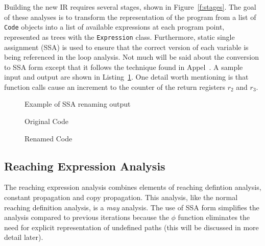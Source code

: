 
Building the new IR requires several stages, shown in Figure~\ref{f:stages}. The goal of these analyses is to transform the representation of the program from a list of \texttt{Code} objects into a list of available expressions at each program point, represented as trees with the \texttt{Expression} class. Furthermore, static single assignment (SSA) is used to ensure that the correct version of each variable is being referenced in the loop analysis. Not much will be said about the conversion to SSA form except that it follows the technique found in Appel~\cite{andrew2002modern}. A sample input and output are shown in Listing~\ref{l:ssa-example}. One detail worth mentioning is that function calls cause an increment to the counter of the return registers $r_2$ and $r_3$.


\begin{figure}[h]
\captionsetup{type=lstlisting}
\caption{Example of SSA renaming output}
\begin{sublstlisting}[t]{0.47\linewidth}
\caption{Original Code}

\end{sublstlisting} \hfill
\begin{sublstlisting}[t]{0.47\linewidth}
\caption{Renamed Code}

\end{sublstlisting}
\label{l:ssa-example}
\end{figure}




\subsection{Reaching Expression Analysis}

The reaching expression analysis combines elements of reaching defintion analysis, constant propagation and copy propagation. This analysis, like the normal reaching definition analysis, is a \textit{may} analysis. The use of SSA form simplifies the analysis compared to previous iterations because the $\phi$ function eliminates the need for explicit representation of undefined paths (this will be discussed in more detail later).

